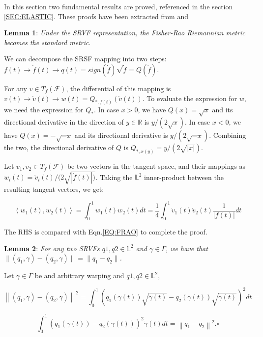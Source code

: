 

In this section two fundamental results are proved, referenced in the section
 \ref{SEC:ELASTIC}. These proofs have been extracted from
 \cite{Srivastava2016} and \cite{Srivastava2011}

\textbf{Lemma 1}: \textit{Under the SRVF representation, the Fisher-Rao Riemannian metric
becomes the standard metric}.

We can decompose the SRSF mapping into two steps:
$f(t) \rightarrow \dot f(t) \rightarrow q(t)=sign(\dot f) \sqrt{\dot f}=Q(\dot f)$.

For any $v \in T_f(\mathcal{F})$, the differential of this mapping is
$v(t) \rightarrow \dot v(t) \rightarrow w(t) = Q_{*, f(t)}(\dot v(t))$.
To evaluate the expression for $w$, we need the expression for $Q_{*}$.
In case $x > 0$, we have $Q(x) = \sqrt{x}$ and its directional derivative in the
direction of $y \in \mathbb{R}$ is $y/(2\sqrt{x})$.
In case $x <0$, we have $Q(x) = - \sqrt{-x}$ and its directional derivative is
$y/(2\sqrt{-x})$. Combining the two, the directional
derivative of $Q$ is $Q_{*,x(y)} = y/(2 \sqrt{|x|})$.

Let $v_1, v_2 \in T_f(\mathcal{F})$ be two vectors in the tangent space, and their
mappings as $w_{i}(t) = \dot{v}_{i}(t) /(2 \sqrt{|\dot{f}(t)| )}$.
Taking the $\mathbb{L}^2$ inner-product between the resulting tangent vectors, we get:

$$
\left\langle w_{1}(t), w_{2}(t)\right\rangle=\int_{0}^{1} w_{1}(t) w_{2}(t) d t=\frac{1}{4} \int_{0}^{1} \dot{v}_{1}(t) \dot{v}_{2}(t) \frac{1}{|f(t)|} d t
$$


The RHS is compared with Eqn.\ref{EQ:FRAO} to complete the proof.


\textbf{Lemma 2}: \textit{For any two SRVFs $q1, q2 \in \mathbb{L}^2$ and $\gamma \in
\Gamma$, we have that $\|(q_1, \gamma) - (q_2, \gamma)\| = \| q_1 - q_2\|$.}

Let $\gamma \in \Gamma$ be and arbitrary warping and $q1, q2 \in \mathbb{L}^2$,

$$
\left\|\left(q_{1}, \gamma\right)-\left(q_{2}, \gamma\right)\right\|^{2}=
\int_{0}^{1}\left(q_{1}(\gamma(t)) \sqrt{\dot{\gamma}(t)}-q_{2}(\gamma(t))
\sqrt{\dot{\gamma}(t)}\right)^{2} d t=
$$

$$
\int_{0}^{1}\left(q_{1}(\gamma(t))-q_{2}
(\gamma(t))\right)^{2} \dot{\gamma}(t) d t=\left\|q_{1}-q_{2}\right\|^{2} . \square
$$
